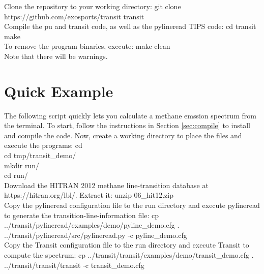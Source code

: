 \documentclass[letterpaper, 12pt]{article}
\begin{document}
\noindent Clone the repository to your working directory: \newline
{\tttb git clone https://github.com/exosports/transit transit} \\

\noindent Compile the {\tttm pu} and {\tttm transit} code, as well as
the {\tttm pylineread} TIPS code: \newline
{\tttb cd transit} \\
{\tttb make} \\

\noindent To remove the program binaries, execute: \newline
{\tttb make clean} \\

\noindent Note that there will be warnings.

\newpage

\section{Quick Example}
\label{sec:quick-example}

The following script quickly lets you calculate a methane emssion
spectrum from the terminal.  To start, follow the instructions in
Section \ref{sec:compile} to install and compile the code.  Now,
create a working directory to place the files and execute the
programs: \newline
{\tttb cd} \\
{\tttb cd tmp/transit\_demo/} \\
{\tttb mkdir run/} \\
{\tttb cd run/} \\

\noindent Download the HITRAN 2012 methane line-transition database at https://hitran.org/lbl/. Extract it: \newline
{\tttb unzip 06\_hit12.zip} \\

\noindent Copy the {\tttm pylineread} configuration file to the run directory and execute pylineread to generate the transition-line-information file: \newline
{\tttb cp ../transit/pylineread/examples/demo/pyline\_demo.cfg .} \\
{\tttb ../transit/pylineread/src/pylineread.py -c pyline\_demo.cfg} \\

\noindent Copy the Transit configuration file to the run
directory and execute Transit to compute the spectrum: \newline
{\tttb cp ../transit/transit/examples/demo/transit\_demo.cfg .} \\
{\tttb ../transit/transit/transit -c transit\_demo.cfg} \\
\end{document}
